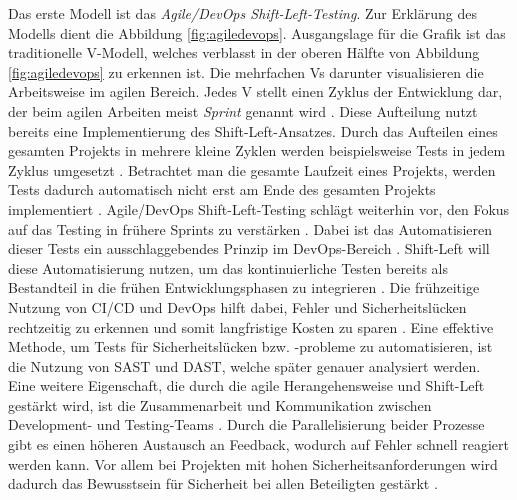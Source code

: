Das erste Modell ist das \textit{Agile/DevOps Shift-Left-Testing}. Zur Erklärung des Modells dient die Abbildung \ref{fig:agiledevops}. Ausgangslage für die Grafik ist das traditionelle V-Modell, welches verblasst in der oberen Hälfte von Abbildung \ref{fig:agiledevops} zu erkennen ist. Die mehrfachen Vs darunter visualisieren die Arbeitsweise im agilen Bereich. Jedes V stellt einen Zyklus der Entwicklung dar, der beim agilen Arbeiten meist \textit{Sprint} genannt wird \cite{rani_shift-left_2023}. Diese Aufteilung nutzt bereits eine Implementierung des Shift-Left-Ansatzes. Durch das Aufteilen eines gesamten Projekts in mehrere kleine Zyklen werden beispielsweise Tests in jedem Zyklus umgesetzt \cite{rani_shift-left_2023}. Betrachtet man die gesamte Laufzeit eines Projekts, werden Tests dadurch automatisch nicht erst am Ende des gesamten Projekts implementiert \cite{bjerke-gulstuen_high_2015}. Agile/DevOps Shift-Left-Testing schlägt weiterhin vor, den Fokus auf das Testing in frühere Sprints zu verstärken \cite{bjerke-gulstuen_high_2015}. Dabei ist das Automatisieren dieser Tests ein ausschlaggebendes Prinzip im DevOps-Bereich \cite{rani_shift-left_2023}. Shift-Left will diese Automatisierung nutzen, um das kontinuierliche Testen bereits als Bestandteil in die frühen Entwicklungsphasen zu integrieren \cite{rani_shift-left_2023}. Die frühzeitige Nutzung von CI/CD und DevOps hilft dabei, Fehler und Sicherheitslücken rechtzeitig zu erkennen und somit langfristige Kosten zu sparen \cite{rani_shift-left_2023}. Eine effektive Methode, um Tests für Sicherheitslücken bzw. -probleme zu automatisieren, ist die Nutzung von SAST und DAST, welche später genauer analysiert werden. Eine weitere Eigenschaft, die durch die agile Herangehensweise und Shift-Left gestärkt wird, ist die Zusammenarbeit und Kommunikation zwischen Development- und Testing-Teams \cite{rani_shift-left_2023}. Durch die Parallelisierung beider Prozesse gibt es einen höheren Austausch an Feedback, wodurch auf Fehler schnell reagiert werden kann. Vor allem bei Projekten mit hohen Sicherheitsanforderungen wird dadurch das Bewusstsein für Sicherheit bei allen Beteiligten gestärkt \cite{dawoud_better_2024}.

